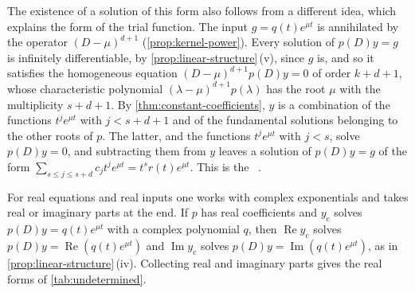 The existence of a solution of this form also follows from a different idea, which explains the form of the trial function. The input $g=q(t)e^{\mu t}$ is annihilated by the operator $(D-\mu)^{d+1}$ (\cref{prop:kernel-power}). Every solution of $p(D)y=g$ is infinitely differentiable, by \cref{prop:linear-structure}\,(v), since $g$ is, and so it satisfies the homogeneous equation $(D-\mu)^{d+1}p(D)y=0$ of order $k+d+1$, whose characteristic polynomial $(\lambda-\mu)^{d+1}p(\lambda)$ has the root $\mu$ with the multiplicity $s+d+1$. By \cref{thm:constant-coefficients}, $y$ is a combination of the functions $t^je^{\mu t}$ with $j<s+d+1$ and of the fundamental solutions belonging to the other roots of $p$. The latter, and the functions $t^je^{\mu t}$ with $j<s$, solve $p(D)y=0$, and subtracting them from $y$ leaves a solution of $p(D)y=g$ of the form $\sum_{s\le j\le s+d}c_jt^je^{\mu t}=t^sr(t)e^{\mu t}$. This is the ~\cite[Chap.~6]{apostol1969calculus}.

For real equations and real inputs one works with complex exponentials and takes real or imaginary parts at the end. If $p$ has real coefficients and $y_{\mathrm c}$ solves $p(D)y=q(t)e^{\mu t}$ with a complex polynomial $q$, then $\operatorname{Re}y_{\mathrm c}$ solves $p(D)y=\operatorname{Re}(q(t)e^{\mu t})$ and $\operatorname{Im}y_{\mathrm c}$ solves $p(D)y=\operatorname{Im}(q(t)e^{\mu t})$, as in \cref{prop:linear-structure}\,(iv). Collecting real and imaginary parts gives the real forms of \cref{tab:undetermined}.

\begin{table}
\end{table}

